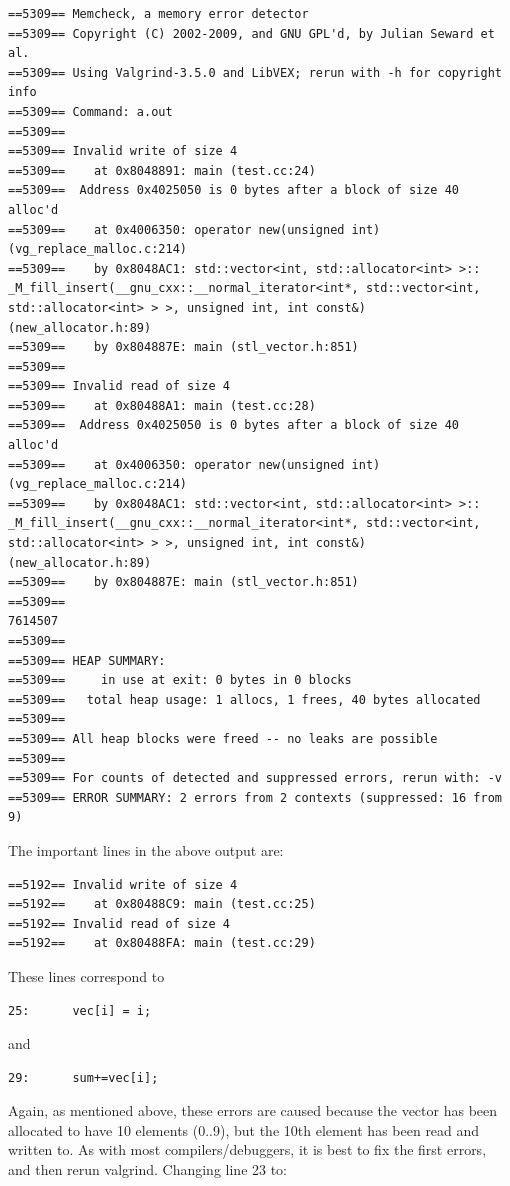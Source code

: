 \documentclass[12pt]{article}
\begin{document}
{\small
\begin{verbatim}
==5309== Memcheck, a memory error detector
==5309== Copyright (C) 2002-2009, and GNU GPL'd, by Julian Seward et al.
==5309== Using Valgrind-3.5.0 and LibVEX; rerun with -h for copyright info
==5309== Command: a.out
==5309== 
==5309== Invalid write of size 4
==5309==    at 0x8048891: main (test.cc:24)
==5309==  Address 0x4025050 is 0 bytes after a block of size 40 alloc'd
==5309==    at 0x4006350: operator new(unsigned int) (vg_replace_malloc.c:214)
==5309==    by 0x8048AC1: std::vector<int, std::allocator<int> >::
_M_fill_insert(__gnu_cxx::__normal_iterator<int*, std::vector<int, 
std::allocator<int> > >, unsigned int, int const&) (new_allocator.h:89)
==5309==    by 0x804887E: main (stl_vector.h:851)
==5309== 
==5309== Invalid read of size 4
==5309==    at 0x80488A1: main (test.cc:28)
==5309==  Address 0x4025050 is 0 bytes after a block of size 40 alloc'd
==5309==    at 0x4006350: operator new(unsigned int) (vg_replace_malloc.c:214)
==5309==    by 0x8048AC1: std::vector<int, std::allocator<int> >::
_M_fill_insert(__gnu_cxx::__normal_iterator<int*, std::vector<int, 
std::allocator<int> > >, unsigned int, int const&) (new_allocator.h:89)
==5309==    by 0x804887E: main (stl_vector.h:851)
==5309== 
7614507
==5309== 
==5309== HEAP SUMMARY:
==5309==     in use at exit: 0 bytes in 0 blocks
==5309==   total heap usage: 1 allocs, 1 frees, 40 bytes allocated
==5309== 
==5309== All heap blocks were freed -- no leaks are possible
==5309== 
==5309== For counts of detected and suppressed errors, rerun with: -v
==5309== ERROR SUMMARY: 2 errors from 2 contexts (suppressed: 16 from 9)
\end{verbatim}
The important lines in the above output are:
\begin{verbatim}
==5192== Invalid write of size 4
==5192==    at 0x80488C9: main (test.cc:25)
==5192== Invalid read of size 4
==5192==    at 0x80488FA: main (test.cc:29)
\end{verbatim}
These lines correspond to
\begin{verbatim}
25:      vec[i] = i;
\end{verbatim}
and
\begin{verbatim}
29:      sum+=vec[i];
\end{verbatim}
Again, as mentioned above, these errors are caused because the vector
has been allocated to have 10 elements (0..9), but the 10th element
has been read and written to.   As with most compilers/debuggers, it
is best to fix the first errors, and then rerun valgrind.  Changing 
line 23 to:
}
\end{document}
